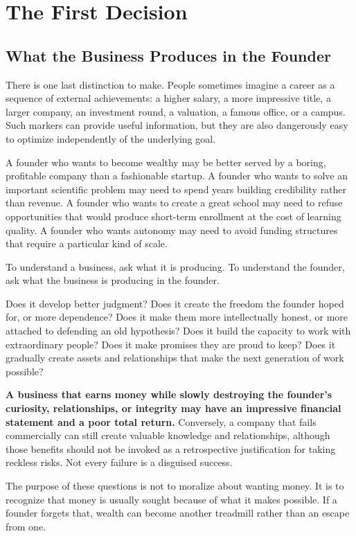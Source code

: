 \section{The First Decision}

\subsection{What the Business Produces in the Founder}

There is one last distinction to make. People sometimes imagine a career as a sequence of external achievements: a higher salary, a more impressive title, a larger company, an investment round, a valuation, a famous office, or a campus. Such markers can provide useful information, but they are also dangerously easy to optimize independently of the underlying goal.

A founder who wants to become wealthy may be better served by a boring, profitable company than a fashionable startup. A founder who wants to solve an important scientific problem may need to spend years building credibility rather than revenue. A founder who wants to create a great school may need to refuse opportunities that would produce short-term enrollment at the cost of learning quality. A founder who wants autonomy may need to avoid funding structures that require a particular kind of scale.

To understand a business, ask what it is producing. To understand the founder, ask what the business is producing in the founder.

Does it develop better judgment? Does it create the freedom the founder hoped for, or more dependence? Does it make them more intellectually honest, or more attached to defending an old hypothesis? Does it build the capacity to work with extraordinary people? Does it make promises they are proud to keep? Does it gradually create assets and relationships that make the next generation of work possible?

\textbf{A business that earns money while slowly destroying the founder's curiosity, relationships, or integrity may have an impressive financial statement and a poor total return.} Conversely, a company that fails commercially can still create valuable knowledge and relationships, although those benefits should not be invoked as a retrospective justification for taking reckless risks. Not every failure is a disguised success.

The purpose of these questions is not to moralize about wanting money. It is to recognize that money is usually sought because of what it makes possible. If a founder forgets that, wealth can become another treadmill rather than an escape from one.

